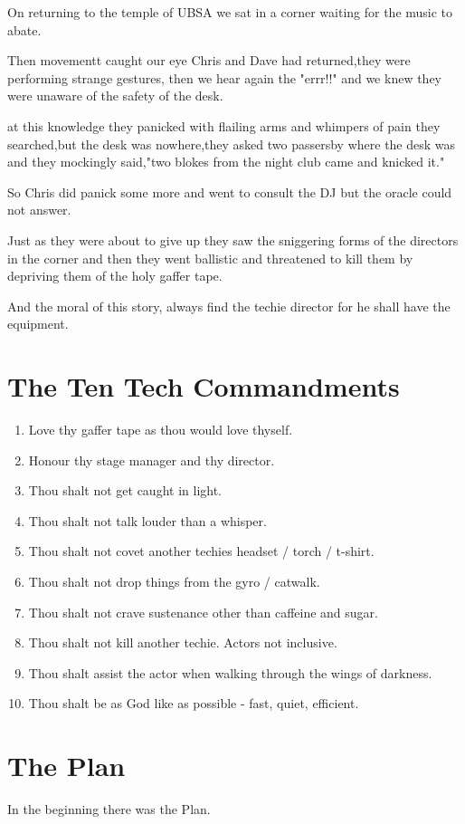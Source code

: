 \documentclass[10pt,a4paper,oneside]{article}
\begin{document}
On returning to the temple of UBSA we sat in a corner waiting for the music to abate. 

Then movementt caught our eye Chris and Dave had returned,they were performing strange gestures, then we hear again the "errr!!" and we knew they were unaware of the safety of the desk. 

at this knowledge they panicked with flailing arms and whimpers of pain they searched,but the desk was nowhere,they asked two passersby where the desk was and they mockingly said,"two blokes from the night club came and knicked it." 

So Chris did panick some more and went to consult the DJ but the oracle could not answer. 

Just as they were about to give up they saw the sniggering forms of the directors in the corner and then they went ballistic and threatened to kill them by depriving them of the holy gaffer tape. 

And the moral of this story, always find the techie director for he shall have the equipment.

\section{The Ten Tech Commandments}
\begin{enumerate}
\item Love thy gaffer tape as thou would love thyself.
\item Honour thy stage manager and thy director.
\item Thou shalt not get caught in light.
\item Thou shalt not talk louder than a whisper.
\item Thou shalt not covet another techies headset / torch / t-shirt.
\item Thou shalt not drop things from the gyro / catwalk.
\item Thou shalt not crave sustenance other than caffeine and sugar.
\item Thou shalt not kill another techie. Actors not inclusive.
\item Thou shalt assist the actor when walking through the wings of darkness.
\item Thou shalt be as God like as possible - fast, quiet, efficient.
\end{enumerate}

\section{The Plan}
In the beginning there was the Plan.
\end{document}

